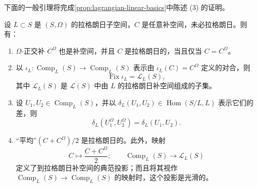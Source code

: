 下面的一般引理将完成\cref{prop:lagrangian-linear-basics}中陈述 (3) 的证明。

\begin{lemma}\label{lem:lagrangian-complement-average}
设 $L\subset S$ 是 $(S,\Omega)$ 的拉格朗日子空间，$C$ 是任意补空间，未必拉格朗日。则有：
\begin{enumerate}[label=(\arabic*)]
\item $\Omega$-正交补 $C^\Omega$ 也是补空间，并且 $C$ 是拉格朗日的，当且仅当 $C=C^\Omega$。
\item 以 $\iota_L:\operatorname{Comp}_L(S)\to\operatorname{Comp}_L(S)$ 表示由
$\iota_L(C)=C^\Omega$ 定义的对合，则
\[
 \operatorname{Fix}\iota_L=\mathcal L_L(S),
\]
其中 $\mathcal L_L(S)$ 是 $\mathcal L(S)$ 中由 $L$ 的拉格朗日补空间组成的子集。
\item 设 $U_1,U_2\in\operatorname{Comp}_L(S)$，并以
$\delta_L(U_1,U_2)\in\operatorname{Hom}(S/L,L)$ 表示它们的差，则
\begin{equation}
 \delta_L(U_1^\Omega,U_2^\Omega)=\delta_L(U_1,U_2).
 \label{eq:orthogonal-complement-difference}
\end{equation}
\item “平均”$(C+C^\Omega)/2$ 是拉格朗日的。此外，映射
\[
 C\longmapsto\frac{C+C^\Omega}{2};\qquad
 \operatorname{Comp}_L(S)\longrightarrow\mathcal L_L(S)
\]
定义了到拉格朗日补空间的典范投影；而且将其视作
$\operatorname{Comp}_L(S)\to\operatorname{Comp}_L(S)$ 的映射时，这个投影是光滑的。
\end{enumerate}
\end{lemma}

